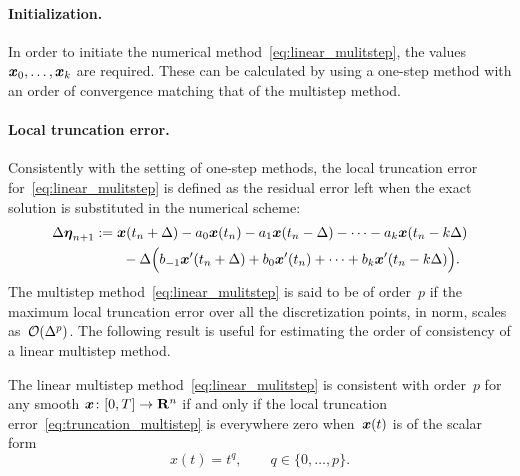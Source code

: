 \paragraph{Initialization.}
In order to initiate the numerical method~\eqref{eq:linear_mulitstep},
the values $\mathbf{\boldsymbol{x}}_0, \dotsc, \mathbf{\boldsymbol{x}}_{k}$ are required.
These can be calculated by using a one-step method with an order of convergence matching that of the multistep method.

\paragraph{Local truncation error.}
Consistently with the setting of one-step methods,
the local truncation error for~\eqref{eq:linear_mulitstep} is defined as the residual error left when the exact solution is substituted in the numerical scheme:
\begin{align}
    \nonumber
    \Delta \mathbf{\boldsymbol{\eta}}_{n+1}
        &:= \mathbf{\boldsymbol{x}}(t_n + \Delta) - a_0 \mathbf{\boldsymbol{x}}(t_n) - a_1 \mathbf{\boldsymbol{x}}(t_n - \Delta) - \dotsb - a_k \mathbf{\boldsymbol{x}}(t_n - k \Delta) \\
        \label{eq:truncation_multistep}
        & \qquad- \Delta \Bigl( b_{-1} \mathbf{\boldsymbol{x}}'(t_n + \Delta) + b_0 \mathbf{\boldsymbol{x}}'(t_n) + \dotsb + b_k \mathbf{\boldsymbol{x}}'(t_n - k \Delta) \Bigr).
\end{align}
The multistep method~\eqref{eq:linear_mulitstep} is said to be of order~$p$ if the maximum local truncation error
over all the discretization points, in norm, scales as~$\mathcal O(\Delta^p)$.
The following result is useful for estimating the order of consistency of a linear multistep method.
\begin{proposition}
    The linear multistep method~\eqref{eq:linear_mulitstep} is consistent with order~$p$ for any smooth $\mathbf{\boldsymbol{x}}\colon [0, T] \to \mathbf R^n$ if and only if
    the local truncation error~\eqref{eq:truncation_multistep} is everywhere zero when~$\mathbf{\boldsymbol{x}}(t)$ is of the scalar form
    \begin{equation}
        \label{eq:polynomial_form}
        x(t) = t^{q}, \qquad q \in \{0, \dotsc, p\}.
    \end{equation}
\end{proposition}
